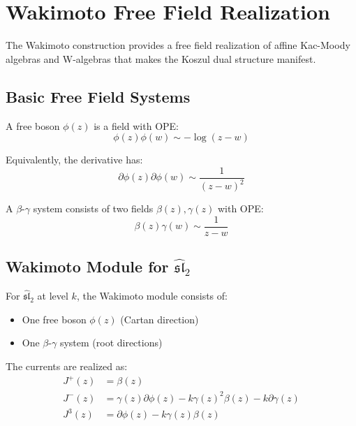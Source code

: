 
\section{Wakimoto Free Field Realization}
\label{sec:wakimoto-realization}

The Wakimoto construction provides a free field realization of affine Kac-Moody 
algebras and W-algebras that makes the Koszul dual structure manifest.

\subsection{Basic Free Field Systems}

\begin{definition}
\label{def:free-boson-wakimoto}
A free boson $\phi(z)$ is a field with OPE:
$$\phi(z)\phi(w) \sim -\log(z-w)$$

Equivalently, the derivative has:
$$\partial\phi(z) \partial\phi(w) \sim \frac{1}{(z-w)^2}$$
\end{definition}

\begin{definition}
\label{def:beta-gamma-system-wake}
A $\beta$-$\gamma$ system consists of two fields 
$\beta(z), \gamma(z)$ with OPE:
$$\beta(z)\gamma(w) \sim \frac{1}{z-w}$$
\end{definition}

\subsection{Wakimoto Module for $\widehat{\mathfrak{sl}}_2$}

\begin{construction}
\label{const:wakimoto-sl2}

For $\widehat{\mathfrak{sl}}_2$ at level $k$, the Wakimoto module consists of:
\begin{itemize}
\item One free boson $\phi(z)$ (Cartan direction)
\item One $\beta$-$\gamma$ system (root directions)
\end{itemize}

The currents are realized as:
\begin{align}
J^+(z) &= \beta(z) \\
J^-(z) &= \gamma(z)\partial\phi(z) - k\gamma(z)^2\beta(z) - k\partial\gamma(z) \\
J^3(z) &= \partial\phi(z) - k\gamma(z)\beta(z)
\end{align}
\end{construction}

